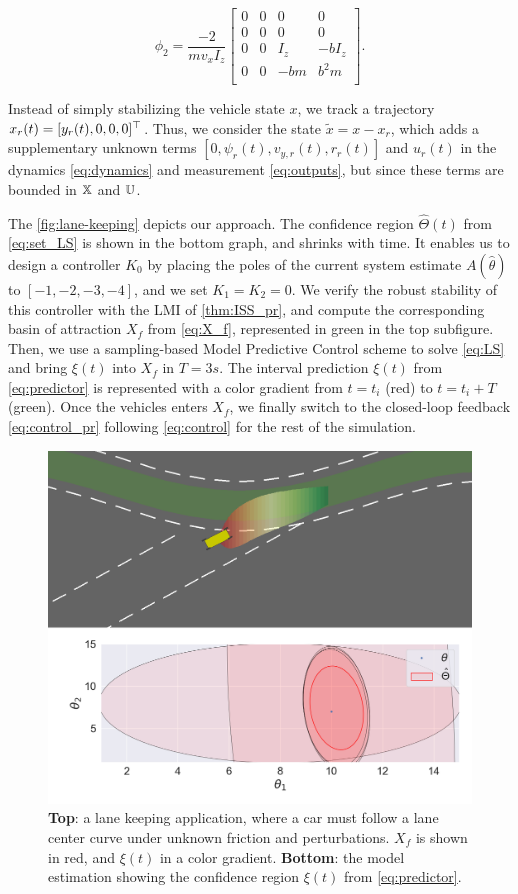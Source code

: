 \documentclass[letterpaper, 10 pt, conference]{ieeeconf}  %
\begin{document}
\[
\phi_2 = \frac{-2}{m v_x I_z}\begin{bmatrix}
0 & 0 & 0 & 0 \\
0 & 0 & 0 & 0 \\
0 & 0 & I_z & -b I_z \\
0 & 0 & - bm & b^2 m \\
\end{bmatrix}.
\]

Instead of simply stabilizing the vehicle state $x$, we track a trajectory $x_r(t) = [y_r(t), 0, 0, 0]^\top$. Thus, we consider the state $\tilde{x} = x-x_r$, which adds a supplementary unknown terms $[0, \psi_r(t), v_{y,r}(t), r_r(t)]$ and $u_r(t)$ in the dynamics \eqref{eq:dynamics} and measurement \eqref{eq:outputs}, but since these terms are bounded in $\mathbb{X}$ and $\mathbb{U}$.

The \autoref{fig:lane-keeping} depicts our approach. The confidence region $\hat{\Theta}(t)$ from \eqref{eq:set_LS} is shown in the bottom graph, and shrinks with time. It enables us to design a controller $K_0$ by placing the poles of the current system estimate $A(\hat{\theta})$ to $[-1, -2, -3, -4]$, and we set $K_1=K_2=0$. We verify the robust stability of this controller with the LMI of \autoref{thm:ISS_pr}, and compute the corresponding basin of attraction $X_f$ from \eqref{eq:X_f}, represented in green in the top subfigure. Then, we use a sampling-based Model Predictive Control scheme to solve \eqref{eq:LS} and bring $\xi(t)$ into $X_f$ in $T=3s$. The interval prediction $\xi(t)$ from \eqref{eq:predictor} is represented with a color gradient from $t=t_i$ (red) to $t=t_i+T$ (green). Once the vehicles enters $X_f$, we finally switch to the closed-loop feedback \eqref{eq:control_pr} following \eqref{eq:control} for the rest of the simulation.
\begin{figure}
    \centering
    \includegraphics[width=\linewidth]{img/lane-keeping.png}
    \caption{\textbf{Top}: a lane keeping application, where a car must follow a lane center curve under unknown friction and perturbations. $X_f$ is shown in red, and $\xi(t)$ in a color gradient. \textbf{Bottom}: the model estimation showing the confidence region $\xi(t)$ from \eqref{eq:predictor}.}
    \label{fig:lane-keeping}
\end{figure}
\end{document}
